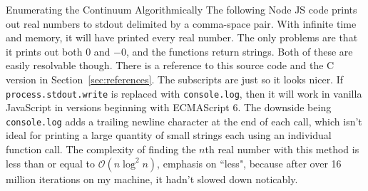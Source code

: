 \documentclass[12pt]{article}
\begin{document}
\pagebreak\begin{section}{Enumerating the Continuum Algorithmically}\label{sec:algorithm code}
	The following Node JS code prints out real numbers to stdout delimited by a comma-space
	pair. With infinite time and memory, it will have printed every real number. The only
	problems are that it prints out both $0$ and $-0$, and the functions return strings.
	Both of these are easily resolvable though. There is a reference to this source code and
	the C version in Section~\ref{sec:references}. The subscripts are just so it looks nicer.
	If \texttt{process.stdout.write} is replaced with \texttt{console.log}, then it will work
	in vanilla JavaScript in versions beginning with ECMAScript 6. The downside being
	\texttt{console.log} adds a trailing newline character at the end of each call, which
	isn't ideal for printing a large quantity of small strings each using an individual
	function call. The complexity of finding the $n$th real number with this method is less
	than or equal to $\mathcal O\!\left(n\log^2n\right)$, emphasis on ``less", because
	after over 16 million iterations on my machine, it hadn't slowed down noticably.


\end{section}
\end{document}
